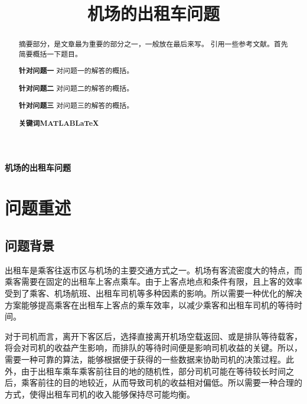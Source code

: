 \documentclass{cumcm}
\title{机场的出租车问题}
\begin{document}
 

\begin{minipage}{0.9\textwidth}
\centering\LARGE\textbf{机场的出租车问题}
\end{minipage}

\begin{abstract}
	摘要部分，是文章最为重要的部分之一，一般放在最后来写。
	引用一些参考文献。首先简要概括一下题目。\par
	\textbf{针对问题一}\quad
	对问题一的解答的概括。\par
	\textbf{针对问题二}\quad
	对问题二的解答的概括。\par
	\textbf{针对问题三}\quad
	对问题三的解答的概括。
\\\par
\textbf{关键词\quad MATLAB\quad \LaTeX}
\end{abstract}

\newpage
\section{问题重述}
\subsection{问题背景}
出租车是乘客往返市区与机场的主要交通方式之一。机场有客流密度大的特点，而乘客需要在固定的出租车上客点乘车。由于上客点地点和条件有限，且上客的效率受到了乘客、机场航班、出租车司机等多种因素的影响。所以需要一种优化的解决方案能够提高乘客在出租车上客点的乘车效率，以减少乘客和出租车司机的等待时间。\par
对于司机而言，离开下客区后，选择直接离开机场空载返回、或是排队等待载客，将会对司机的收益产生影响，而排队的等待时间便是影响司机收益的关键。所以，需要一种可靠的算法，能够根据便于获得的一些数据来协助司机的决策过程。此外，由于出租车乘车乘客前往目的地的随机性，部分司机可能在等待较长时间之后，乘客前往的目的地较近，从而导致司机的收益相对偏低。所以需要一种合理的方式，使得出租车司机的收入能够保持尽可能均衡。
\end{document}
